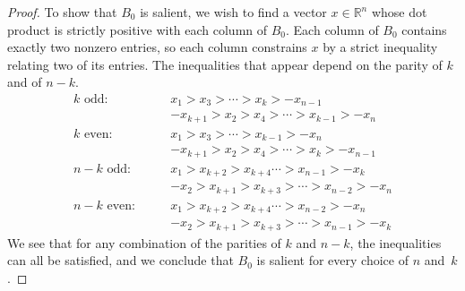 \documentclass{amsart}
\theoremstyle{definition}
\theoremstyle{remark}
\numberwithin{equation}{section}
\newcommand{\reals}{\mathbb R}
\newcommand{\0}{{\mathbf{0}}}
\begin{document}
\begin{proof}
To show that $B_0$ is salient, we wish to find a vector $x\in\reals^n$ whose dot product is strictly positive with each column of $B_0$.
Each column of $B_0$ contains exactly two nonzero entries, so each column constrains $x$ by a strict inequality relating two of its entries.
The inequalities that appear depend on the parity of $k$ and of $n-k$.
\begin{align*}
k\text{ odd:}\qquad
&x_1>x_3>\cdots>x_k>-x_{n-1}\\
&-x_{k+1}>x_2>x_4>\cdots>x_{k-1}>-x_n\\
k\text{ even:}\qquad
&x_1>x_3>\cdots>x_{k-1}>-x_n\\
&-x_{k+1}>x_2>x_4>\cdots>x_k>-x_{n-1}\\
n-k\text{ odd:}\qquad
&x_1>x_{k+2}>x_{k+4}\cdots>x_{n-1}>-x_k\\
&-x_2>x_{k+1}>x_{k+3}>\cdots>x_{n-2}>-x_n\\
n-k\text{ even:}\qquad
&x_1>x_{k+2}>x_{k+4}\cdots>x_{n-2}>-x_n\\
&-x_2>x_{k+1}>x_{k+3}>\cdots>x_{n-1}>-x_k
\end{align*}
We see that for any combination of the parities of $k$ and $n-k$, the inequalities can all be satisfied, and we conclude that $B_0$ is salient for every choice of $n$ and~$k$.
%
\end{proof}




\end{document}
